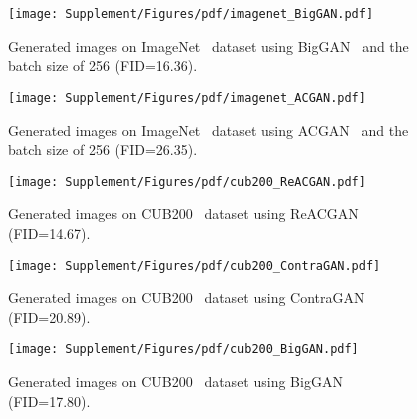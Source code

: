 \documentclass{article}
\begin{document}
\begin{figure}[ht]
    \centering
    \texttt{[image: Supplement/Figures/pdf/imagenet\_BigGAN.pdf]}
    \hspace{-0.25cm}
    \caption{Generated images on ImageNet~\cite{Deng2009ImageNetAL} dataset using BigGAN~\cite{Brock2019LargeSG} and the batch size of 256 (FID=16.36).} 
    \label{fig:Figure_qualitative_big_img256}
\end{figure} 

\begin{figure}[ht]
    \centering
    \texttt{[image: Supplement/Figures/pdf/imagenet\_ACGAN.pdf]}
    \hspace{-0.25cm}
    \caption{Generated images on ImageNet~\cite{Deng2009ImageNetAL} dataset using ACGAN~\cite{Odena2017ConditionalIS} and the batch size of 256 (FID=26.35).}
    \label{fig:Figure_qualitative_ac_img}
\end{figure} 


\begin{figure}[ht]
    \centering
    \texttt{[image: Supplement/Figures/pdf/cub200\_ReACGAN.pdf]}
    \hspace{-0.25cm}
    \caption{Generated images on CUB200~\cite{WelinderEtal2010} dataset using ReACGAN (FID=14.67).} 
    \label{fig:Figure_qualitative_reac_cub}
\end{figure} 

\begin{figure}[ht]
    \centering
    \texttt{[image: Supplement/Figures/pdf/cub200\_ContraGAN.pdf]}
    \hspace{-0.25cm}
    \caption{Generated images on CUB200~\cite{WelinderEtal2010} dataset using ContraGAN~\cite{kang2020contragan} (FID=20.89).}
    \label{fig:Figure_qualitative_contra_cub}
\end{figure} 

\begin{figure}[ht]
    \centering
    \texttt{[image: Supplement/Figures/pdf/cub200\_BigGAN.pdf]}
    \hspace{-0.25cm}
    \caption{Generated images on CUB200~\cite{WelinderEtal2010} dataset using BigGAN~\cite{Brock2019LargeSG} (FID=17.80).}
    \label{fig:Figure_qualitative_big_cub}
\end{figure} 
\end{document}
